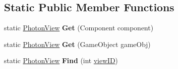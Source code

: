 \subsection*{Static Public Member Functions}
\begin{DoxyCompactItemize}
\item 
static \hyperlink{class_photon_view}{Photon\+View} {\bfseries Get} (Component component)\hypertarget{class_photon_view_ace8c64cae230e1fbd3356112274e4d8d}{}\label{class_photon_view_ace8c64cae230e1fbd3356112274e4d8d}

\item 
static \hyperlink{class_photon_view}{Photon\+View} {\bfseries Get} (Game\+Object game\+Obj)\hypertarget{class_photon_view_a24370932ff0a1f79d6dcb83a2bd7a27b}{}\label{class_photon_view_a24370932ff0a1f79d6dcb83a2bd7a27b}

\item 
static \hyperlink{class_photon_view}{Photon\+View} {\bfseries Find} (int \hyperlink{class_photon_view_a309ddedb443400696cf80da2ff579262}{view\+ID})\hypertarget{class_photon_view_a84084cfaf09debaf88362629bb772907}{}\label{class_photon_view_a84084cfaf09debaf88362629bb772907}

\end{DoxyCompactItemize}

